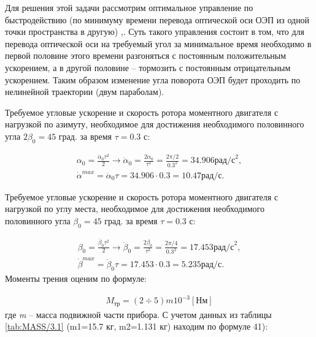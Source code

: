 Для решения этой задачи рассмотрим оптимальное управление по быстродействию (по минимуму времени перевода оптической оси ОЭП из одной точки пространства в другую) \cite[]{Babaev},\cite[]{Boltanski}. Суть такого управления состоит в том, что для перевода оптической оси на требуемый угол за минимальное время необходимо в первой половине этого времени разгоняться с постоянным положительным ускорением, а в другой половине – тормозить с постоянным отрицательным ускорением. Таким образом изменение угла поворота ОЭП будет проходить по нелинейной траектории (двум параболам).\par

Требуемое угловые ускорение и скорость ротора моментного двигателя с нагрузкой по азимуту, необходимое для достижения необходимого половинного угла $2 \beta_0 = 45$ град. за время $\tau=0.3$ с:\par

\begin{equation}
\label{eq:p4:1+}
\begin{multlined}
  \alpha _{0} = \frac{ \ddot \alpha _{0} \tau^{2}}{2} \rightarrow 
\ddot \alpha _{0} = \frac{2 \alpha _{0}}{ \tau^{2}} = \frac{2 \pi /2}{  0.3^{2}} = 34.906 \textit{рад/с}^{2},\\
\dot \alpha ^{max}= \ddot \alpha _{0} \tau = 34.906\cdot 0.3=10.47 \textit{рад/с}. 
\end{multlined}
\end{equation}

Требуемое угловые ускорение и скорость ротора моментного двигателя с нагрузкой по углу места, необходимое для достижения необходимого половинного угла $\beta_0=45$ град. за время $\tau=0.3$ с:

\begin{equation}
\label{eq:p4:1+1}
\begin{multlined}
\beta _{0} = \frac{ \ddot \beta _{0} \tau^{2}}{2} \rightarrow 
\ddot \beta _{0} = \frac{2 \beta _{0}}{ \tau^{2}} = \frac{2 \pi /4}{  0.3^{2}} = 17.453 \textit{рад/с}^{2},\\
\dot \beta ^{max}= \ddot \beta _{0} \tau = 17.453\cdot 0.3=5.235 \textit{рад/с}. 
\end{multlined}
\end{equation}
Моменты трения оценим по формуле:

\begin{equation}%
\label{eq:p4:4}
\begin{multlined}
	M_{\textit{тр}}= \left( 2  \div 5 \right) m 10^{-3} \left[ \textit{Нм} \right] 
\end{multlined}
\end{equation}
где \textit{m} – масса подвижной части прибора. С учетом данных из таблицы \ref{tab:MASS/3.1} (m1=15.7 кг, m2=1.131 кг) находим по формуле 41):\par

